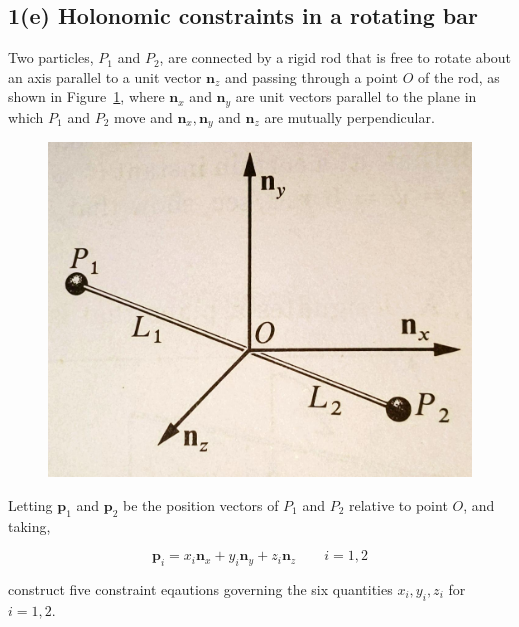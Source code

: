 \subsection{1(e) Holonomic constraints in a rotating bar}
Two particles, $P_1$ and $P_2$, are connected by a rigid rod that is free to rotate about an axis parallel to a unit vector $\pmb n_z$ and passing through a point $O$ of the rod, as shown in Figure~\ref{1_e}, where $\pmb n_x$ and $\pmb n_y$ are unit vectors parallel to the plane in which $P_1$ and $P_2$ move and $\pmb n_x, \pmb n_y$ and $\pmb n_z$ are mutually perpendicular.

\begin{figure}[H]
    \centering
    \includegraphics[scale = 0.15]{figs/ProbSet_1/1_e.jpg}
    \caption{}
    \label{1_e}
\end{figure}

Letting $\pmb p_1$ and $\pmb p_2$ be the position vectors of $P_1$ and $P_2$ relative to point $O$, and taking,

$$\pmb p_i = x_i \pmb n_x + y_i \pmb n_y + z_i \pmb n_z \qquad i = 1, 2$$

construct five constraint eqautions governing the six quantities $x_i, y_i, z_i$ for $i=1, 2$.

